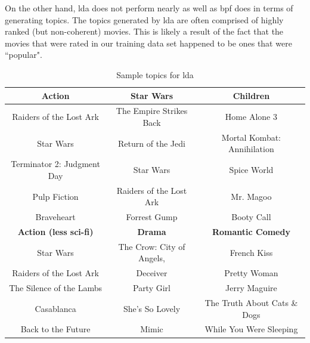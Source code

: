 \documentclass{article} %
\begin{document}
On the other hand, \gls{lda} does not perform nearly as well as \gls{bpf} does in terms of generating topics. The topics generated by \gls{lda} are often comprised of highly ranked (but non-coherent) movies. This is likely a result of the fact that the movies that were rated in our training data set happened to be ones that were ``popular".
\begin{table}[h]
    \begin{tabularx}{\textwidth}{	ccc} \toprule
    \textbf{Action}                     & \textbf{Star Wars}               & \textbf{Children}                    \\ \midrule
    Raiders of the Lost Ark    & The Empire Strikes Back & Home Alone 3                \\
    Star Wars                  & Return of the Jedi      & Mortal Kombat: Annihilation \\
    Terminator 2: Judgment Day & Star Wars               & Spice World                 \\
    Pulp Fiction               & Raiders of the Lost Ark & Mr. Magoo                   \\
    Braveheart                 & Forrest Gump            & Booty Call                   \vspace{3mm} \\  \toprule
    \textbf{Action (less sci-fi)}     & \textbf{Drama}                     & \textbf{Romantic Comedy}              \\ \midrule
    Star Wars                & The Crow: City of Angels, & French Kiss                  \\
    Raiders of the Lost Ark  & Deceiver                  & Pretty Woman                 \\
    The Silence of the Lambs & Party Girl                & Jerry Maguire                \\
    Casablanca               & She's So Lovely           & The Truth About Cats \& Dogs \\
    Back to the Future       & Mimic                     & While You Were Sleeping      \\
    \end{tabularx}
    \caption {Sample topics for \gls{lda}}
\end{table}
\end{document}
